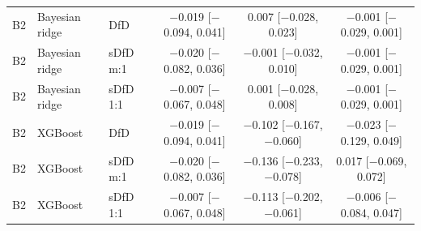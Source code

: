 \begin{longtable}{lllccc}
B2 & Bayesian ridge & DfD & $-$0.019 [$-$0.094, 0.041] & 0.007 [$-$0.028, 0.023] & $-$0.001 [$-$0.029, 0.001] \\
B2 & Bayesian ridge & sDfD m:1 & $-$0.020 [$-$0.082, 0.036] & $-$0.001 [$-$0.032, 0.010] & $-$0.001 [$-$0.029, 0.001] \\
B2 & Bayesian ridge & sDfD 1:1 & $-$0.007 [$-$0.067, 0.048] & 0.001 [$-$0.028, 0.008] & $-$0.001 [$-$0.029, 0.001] \\
B2 & XGBoost & DfD & $-$0.019 [$-$0.094, 0.041] & $-$0.102 [$-$0.167, $-$0.060] & $-$0.023 [$-$0.129, 0.049] \\
B2 & XGBoost & sDfD m:1 & $-$0.020 [$-$0.082, 0.036] & $-$0.136 [$-$0.233, $-$0.078] & 0.017 [$-$0.069, 0.072] \\
B2 & XGBoost & sDfD 1:1 & $-$0.007 [$-$0.067, 0.048] & $-$0.113 [$-$0.202, $-$0.061] & $-$0.006 [$-$0.084, 0.047] \\
\bottomrule
\end{longtable}